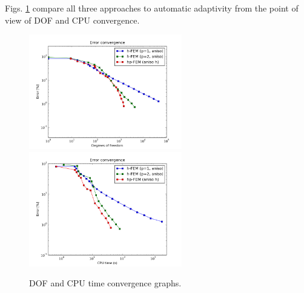 Figs. \ref{fig:nist-9-conv} compare all
three approaches to automatic adaptivity from the point
of view of DOF and CPU convergence.

\begin{figure}[!ht]
\centering
\includegraphics[height=5cm]{nist/nist-9/conv_dof_aniso.png}\ \
\includegraphics[height=5cm]{nist/nist-9/conv_cpu_aniso.png}
\caption{DOF and CPU time convergence graphs.}
\label{fig:nist-9-conv}
\end{figure}

